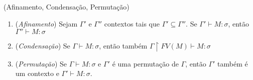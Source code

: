 \documentclass[../main.tex]{subfiles}
\begin{document}
\begin{lemma}(Afinamento, Condensação, Permutação)
    \begin{enumerate}
        \item (\emph{Afinamento}) Sejam $\Gamma'$ e $\Gamma''$ contextos tais que $\Gamma' \subseteq \Gamma''$. Se $\Gamma' \vdash M : \sigma$, então $\Gamma'' \vdash M : \sigma$
        \item (\emph{Condensação}) Se $\Gamma \vdash M : \sigma$, então também  $\Gamma \upharpoonright FV(M) \vdash M : \sigma$
        \item (\emph{Permutação}) Se $\Gamma \vdash M : \sigma$ e $\Gamma'$ é uma permutação de $\Gamma$, então $\Gamma'$ também é um contexto e $\Gamma' \vdash M : \sigma$.
    \end{enumerate}
\end{lemma}
\end{document}
